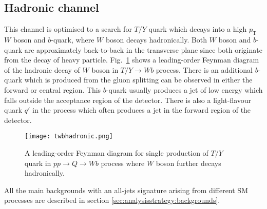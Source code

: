 \subsection{Hadronic channel}%
\label{sec:analysisstrategy:hadronicchannel}
This channel is optimised to a search for $T/Y$ quark which decays into a high $p_{\text{T}}$ $W$ boson and $b$-quark, where $W$ boson decays hadronically. Both $W$ boson and $b$-quark are approximately back-to-back in the transverse plane since both originate from the decay of heavy particle. Fig.\ \ref{fig:analysisstrategy:hadronicchannel} shows a leading-order Feynman diagram of the hadronic decay of $W$ boson in $T/Y \rightarrow Wb$ process. There is an additional $b$-quark which is produced from the gluon splitting can be observed in either the forward or central region. This $b$-quark usually produces a jet of low energy which falls outside the acceptance region of the detector. There is also a light-flavour quark $q'$ in the process which often produces a jet in the forward region of the detector.

\begin{figure}[hbt!]
	\centering
	\texttt{[image: twbhadronic.png]}
	\caption{A leading-order Feynman diagram for single production of $T/Y$ quark in $pp \rightarrow Q\rightarrow Wb$ process where $W$ boson further decays hadronically.}
	\label{fig:analysisstrategy:hadronicchannel}
\end{figure}

All the main backgrounds with an all-jets signature arising from different SM processes are described in section \ref{sec:analysisstrategy:backgrounds}.


